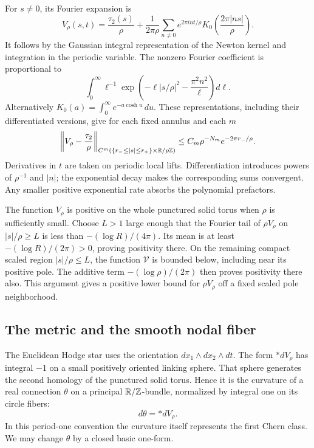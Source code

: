 For \(s\ne0\), its Fourier expansion is
\begin{equation}\label{eq:nodal-fourier}
 V_\rho(s,t)=\frac{\tau_2(s)}{\rho}
  +\frac1{2\pi\rho}\sum_{n\ne0}e^{2\pi int/\rho}
       K_0\left(\frac{2\pi|ns|}{\rho}\right).
\end{equation}
It follows by the Gaussian integral representation of the Newton
kernel and integration in the periodic variable.  The nonzero
Fourier coefficient is proportional to
\[
 \int_0^\infty \ell^{-1}
     \exp\left(-\ell|s/\rho|^2-\frac{\pi^2n^2}{\ell}\right)d\ell.
\]
Alternatively \(K_0(a)=\int_0^\infty e^{-a\cosh u}\,du\).
These representations, including their differentiated versions, give
for each fixed annulus and each \(m\)
\begin{equation}\label{eq:nodal-potential-tail}
 \left\|V_\rho-\frac{\tau_2}{\rho}\right\|_{C^m
  (\{r_-\le|s|\le r_+\}\times\mathbb R/\rho\mathbb Z)}
   \le C_m\rho^{-N_m}e^{-2\pi r_-/\rho}.
\end{equation}
Derivatives in \(t\) are taken on periodic local lifts.
Differentiation introduces powers of \(\rho^{-1}\) and \(|n|\);
the exponential decay makes the corresponding sums convergent.
Any smaller positive exponential rate absorbs the polynomial
prefactors.

The function \(V_\rho\) is positive on the whole punctured solid
torus when \(\rho\) is sufficiently small.  Choose \(L>1\) large
enough that the Fourier tail of \(\rho V_\rho\) on
\(|s|/\rho\ge L\) is less than \(-(\log R)/(4\pi)\).
Its mean is at least \(-(\log R)/(2\pi)>0\), proving positivity
there.  On the remaining compact scaled region \(|s|/\rho\le L\),
the function \(\mathcal V\) is bounded below, including near its
positive pole.  The additive term \(-(\log\rho)/(2\pi)\) then
proves positivity there also.  This argument gives a positive lower
bound for \(\rho V_\rho\) off a fixed scaled pole neighborhood.

\subsection{The metric and the smooth nodal fiber}

The Euclidean Hodge star uses the orientation
\(dx_1\wedge dx_2\wedge dt\).
The form \(*dV_\rho\) has integral \(-1\) on a small positively
oriented linking sphere.  That sphere generates the second homology
of the punctured solid torus.  Hence it is the curvature of a real
connection \(\theta\) on a principal \(\mathbb R/\mathbb Z\)-bundle, normalized by
integral one on its circle fibers:
\begin{equation}\label{eq:nodal-connection}
 d\theta=*dV_\rho.
\end{equation}
In this period-one convention the curvature itself represents the
first Chern class.  We may change \(\theta\) by a closed basic
one-form.

